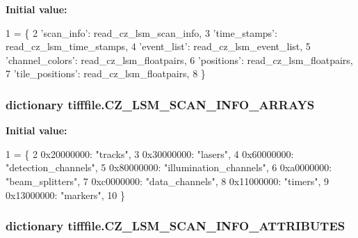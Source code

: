 {\bfseries Initial value\-:}
\begin{DoxyCode}
1 = \{
2     \textcolor{stringliteral}{'scan\_info'}: read\_cz\_lsm\_scan\_info,
3     \textcolor{stringliteral}{'time\_stamps'}: read\_cz\_lsm\_time\_stamps,
4     \textcolor{stringliteral}{'event\_list'}: read\_cz\_lsm\_event\_list,
5     \textcolor{stringliteral}{'channel\_colors'}: read\_cz\_lsm\_floatpairs,
6     \textcolor{stringliteral}{'positions'}: read\_cz\_lsm\_floatpairs,
7     \textcolor{stringliteral}{'tile\_positions'}: read\_cz\_lsm\_floatpairs,
8 \}
\end{DoxyCode}
\hypertarget{namespacetifffile_a676ccf43128489b9cacc376508ba83c3}{
\subsubsection[{C\-Z\-\_\-\-L\-S\-M\-\_\-\-S\-C\-A\-N\-\_\-\-I\-N\-F\-O\-\_\-\-A\-R\-R\-A\-Y\-S}]{\setlength{\rightskip}{0pt plus 5cm}dictionary tifffile.\-C\-Z\-\_\-\-L\-S\-M\-\_\-\-S\-C\-A\-N\-\_\-\-I\-N\-F\-O\-\_\-\-A\-R\-R\-A\-Y\-S}}\label{namespacetifffile_a676ccf43128489b9cacc376508ba83c3}
{\bfseries Initial value\-:}
\begin{DoxyCode}
1 = \{
2     0x20000000: \textcolor{stringliteral}{"tracks"},
3     0x30000000: \textcolor{stringliteral}{"lasers"},
4     0x60000000: \textcolor{stringliteral}{"detection\_channels"},
5     0x80000000: \textcolor{stringliteral}{"illumination\_channels"},
6     0xa0000000: \textcolor{stringliteral}{"beam\_splitters"},
7     0xc0000000: \textcolor{stringliteral}{"data\_channels"},
8     0x11000000: \textcolor{stringliteral}{"timers"},
9     0x13000000: \textcolor{stringliteral}{"markers"},
10 \}
\end{DoxyCode}
\hypertarget{namespacetifffile_a9192b12a20198661f7ce2477725a21b6}{
\subsubsection[{C\-Z\-\_\-\-L\-S\-M\-\_\-\-S\-C\-A\-N\-\_\-\-I\-N\-F\-O\-\_\-\-A\-T\-T\-R\-I\-B\-U\-T\-E\-S}]{\setlength{\rightskip}{0pt plus 5cm}dictionary tifffile.\-C\-Z\-\_\-\-L\-S\-M\-\_\-\-S\-C\-A\-N\-\_\-\-I\-N\-F\-O\-\_\-\-A\-T\-T\-R\-I\-B\-U\-T\-E\-S}}\label{namespacetifffile_a9192b12a20198661f7ce2477725a21b6}
